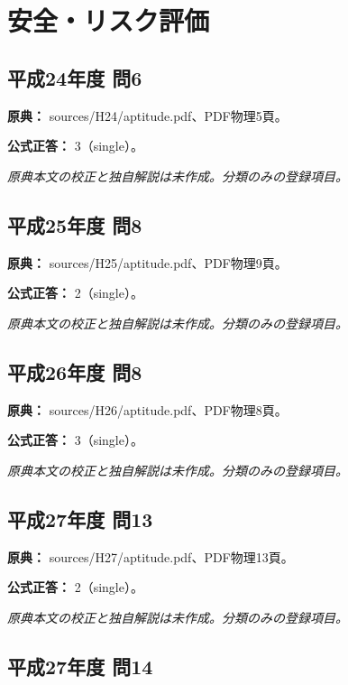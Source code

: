 \section{安全・リスク評価}

\subsection{平成24年度 問6}
\label{q:h24-reg-apt-06}

\noindent\textbf{原典：} sources/H24/aptitude.pdf、PDF物理5頁。

\textbf{公式正答：} 3（single）。

\par\textit{原典本文の校正と独自解説は未作成。分類のみの登録項目。}

\subsection{平成25年度 問8}
\label{q:h25-reg-apt-08}

\noindent\textbf{原典：} sources/H25/aptitude.pdf、PDF物理9頁。

\textbf{公式正答：} 2（single）。

\par\textit{原典本文の校正と独自解説は未作成。分類のみの登録項目。}

\subsection{平成26年度 問8}
\label{q:h26-reg-apt-08}

\noindent\textbf{原典：} sources/H26/aptitude.pdf、PDF物理8頁。

\textbf{公式正答：} 3（single）。

\par\textit{原典本文の校正と独自解説は未作成。分類のみの登録項目。}

\subsection{平成27年度 問13}
\label{q:h27-reg-apt-13}

\noindent\textbf{原典：} sources/H27/aptitude.pdf、PDF物理13頁。

\textbf{公式正答：} 2（single）。

\par\textit{原典本文の校正と独自解説は未作成。分類のみの登録項目。}

\subsection{平成27年度 問14}
\label{q:h27-reg-apt-14}

